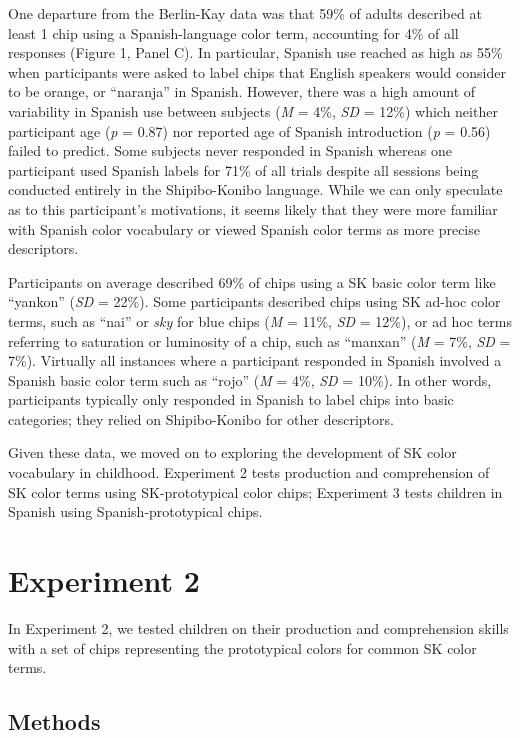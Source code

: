 \documentclass[,man,floatsintext]{apa6}
\theoremstyle{definition}
\theoremstyle{definition}
\theoremstyle{definition}
\theoremstyle{remark}
\begin{document}
One departure from the Berlin-Kay data was that 59\% of adults described
at least 1 chip using a Spanish-language color term, accounting for 4\%
of all responses (Figure 1, Panel C). In particular, Spanish use reached
as high as 55\% when participants were asked to label chips that English
speakers would consider to be orange, or \enquote{naranja} in Spanish.
However, there was a high amount of variability in Spanish use between
subjects (\emph{M} = 4\%, \emph{SD} = 12\%) which neither participant
age (\emph{p} = 0.87) nor reported age of Spanish introduction (\emph{p}
= 0.56) failed to predict. Some subjects never responded in Spanish
whereas one participant used Spanish labels for 71\% of all trials
despite all sessions being conducted entirely in the Shipibo-Konibo
language. While we can only speculate as to this participant's
motivations, it seems likely that they were more familiar with Spanish
color vocabulary or viewed Spanish color terms as more precise
descriptors.

Participants on average described 69\% of chips using a SK basic color
term like \enquote{yankon} (\emph{SD} = 22\%). Some participants
described chips using SK ad-hoc color terms, such as \enquote{nai} or
\emph{sky} for blue chips (\emph{M} = 11\%, \emph{SD} = 12\%), or ad hoc
terms referring to saturation or luminosity of a chip, such as
\enquote{manxan} (\emph{M} = 7\%, \emph{SD} = 7\%). Virtually all
instances where a participant responded in Spanish involved a Spanish
basic color term such as \enquote{rojo} (\emph{M} = 4\%, \emph{SD} =
10\%). In other words, participants typically only responded in Spanish
to label chips into basic categories; they relied on Shipibo-Konibo for
other descriptors.

Given these data, we moved on to exploring the development of SK color
vocabulary in childhood. Experiment 2 tests production and comprehension
of SK color terms using SK-prototypical color chips; Experiment 3 tests
children in Spanish using Spanish-prototypical chips.

\section{Experiment 2}\label{experiment-2}

In Experiment 2, we tested children on their production and
comprehension skills with a set of chips representing the prototypical
colors for common SK color terms.

\subsection{Methods}\label{methods-1}
\end{document}

